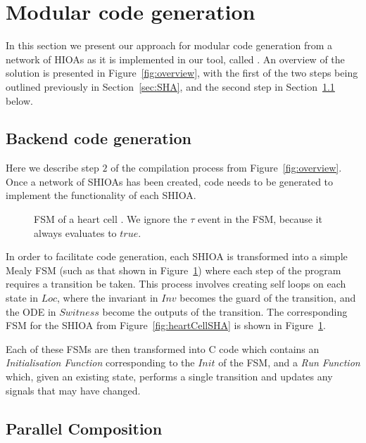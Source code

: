 \section{Modular code generation}
\label{sec:codeGen}

In this section we present our approach for modular code generation from
a network of \acp{HIOA} as it is implemented in our tool, called
\ourTool.  An overview of the solution is presented in
Figure~\ref{fig:overview}, with the first of the two steps being
outlined previously in Section~\ref{sec:SHA}, and the second step in
Section~\ref{sec:backendCodeGeneration} below.


\subsection{Backend code generation}
\label{sec:backendCodeGeneration}

Here we describe step $2$ of the compilation process from
Figure~\ref{fig:overview}. Once a network of \acp{SHIOA} has been
created, code needs to be generated to implement the functionality of
each \ac{SHIOA}.

\begin{figure}
  \centering
  
  \caption{\acf{FSM} of a heart cell \label{fig:heartCellFSM}. We ignore
    the $\tau$ event in the FSM, because it always evaluates to $true$.}
\end{figure}

In order to facilitate code generation, each \ac{SHIOA} is transformed
into a simple Mealy \ac{FSM} (such as that shown in
Figure~\ref{fig:heartCellFSM}) where each step of the program requires a
transition be taken.  This process involves creating self loops on each
state in $Loc$, where the invariant in $Inv$ becomes the guard of the
transition, and the \acs{ODE} in $Switness$ become the outputs of the
transition.  The corresponding \ac{FSM} for the \ac{SHIOA} from
Figure~\ref{fig:heartCellSHA} is shown in Figure~\ref{fig:heartCellFSM}.

Each of these \acp{FSM} are then transformed into C code which contains
an \emph{Initialisation Function} corresponding to the $Init$ of the
\ac{FSM}, and a \emph{Run Function} which, given an existing state,
performs a single transition and updates any signals that may have
changed.


\subsection{Parallel Composition}
\label{sec:composition}

